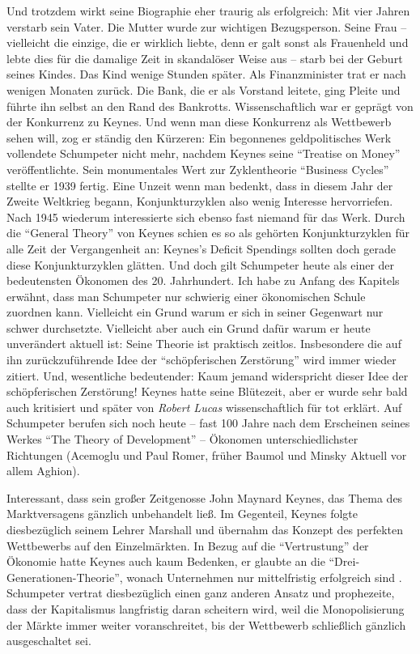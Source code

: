 Und trotzdem wirkt seine Biographie eher traurig als erfolgreich: Mit vier Jahren verstarb sein Vater. Die Mutter wurde zur wichtigen Bezugsperson. Seine Frau -- vielleicht die einzige, die er wirklich liebte, denn er galt sonst als Frauenheld und lebte dies für die damalige Zeit in skandalöser Weise aus -- starb bei der Geburt seines Kindes. Das Kind wenige Stunden später. 
Als Finanzminister trat er nach wenigen Monaten zurück. Die Bank, die er als Vorstand leitete, ging Pleite und führte ihn selbst an den Rand des Bankrotts. Wissenschaftlich war er geprägt von der Konkurrenz zu Keynes. Und wenn man diese Konkurrenz als Wettbewerb sehen will, zog er ständig den Kürzeren: Ein begonnenes geldpolitisches Werk vollendete Schumpeter nicht mehr, nachdem Keynes seine "`Treatise on Money"' veröffentlichte. Sein monumentales Wert zur Zyklentheorie "`Business Cycles"' stellte er 1939 fertig. Eine Unzeit wenn man bedenkt, dass in diesem Jahr der Zweite Weltkrieg begann, Konjunkturzyklen also wenig Interesse hervorriefen. Nach 1945 wiederum interessierte sich ebenso fast niemand für das Werk. Durch die "`General Theory"' von Keynes schien es so als gehörten Konjunkturzyklen für alle Zeit der Vergangenheit an: Keynes's Deficit Spendings sollten doch gerade diese Konjunkturzyklen glätten.
Und doch gilt Schumpeter heute als einer der bedeutensten Ökonomen des 20. Jahrhundert. Ich habe zu Anfang des Kapitels erwähnt, dass man Schumpeter nur schwierig einer ökonomischen Schule zuordnen kann. Vielleicht ein Grund warum er sich in seiner Gegenwart nur schwer durchsetzte. Vielleicht aber auch ein Grund dafür warum er heute unverändert aktuell ist: Seine Theorie ist praktisch zeitlos. Insbesondere die auf ihn zurückzuführende Idee der "`schöpferischen Zerstörung"' wird immer wieder zitiert. Und, wesentliche bedeutender: Kaum jemand widerspricht dieser Idee der schöpferischen Zerstörung! Keynes hatte seine Blütezeit, aber er wurde sehr bald auch kritisiert und später von \textit{Robert Lucas} wissenschaftlich für tot erklärt. Auf Schumpeter berufen sich noch heute -- fast 100 Jahre nach dem Erscheinen seines Werkes "`The Theory of Development"' -- Ökonomen unterschiedlichster Richtungen (Acemoglu und Paul Romer, früher Baumol und Minsky Aktuell vor allem Aghion).

Interessant, dass sein großer Zeitgenosse John Maynard Keynes, das Thema des Marktversagens gänzlich unbehandelt ließ. Im Gegenteil, Keynes folgte diesbezüglich seinem Lehrer Marshall und übernahm das Konzept des perfekten Wettbewerbs auf den Einzelmärkten. In Bezug auf die "`Vertrustung"' der Ökonomie hatte Keynes auch kaum Bedenken, er glaubte an die "`Drei-Generationen-Theorie"', wonach Unternehmen nur mittelfristig erfolgreich sind \parencite[S. 93]{Snowdon2005}. Schumpeter vertrat diesbezüglich einen ganz anderen Ansatz und prophezeite, dass der Kapitalismus langfristig daran scheitern wird, weil die Monopolisierung der Märkte immer weiter voranschreitet, bis der Wettbewerb schließlich gänzlich ausgeschaltet sei.

